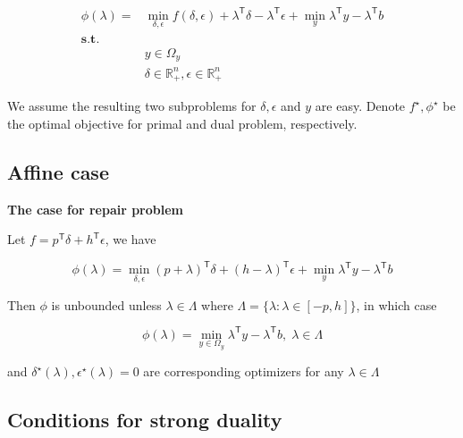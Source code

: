 \begin{equation}\label{eq:dual}
  \begin{aligned}
    \phi(\lambda) = & \min_{\delta, \epsilon} f(\delta, \epsilon) + \lambda^\mathsf{T}\delta - \lambda^\mathsf{T} \epsilon+ \min_y \lambda^\mathsf{T} y - \lambda^\mathsf{T} b \\
    \mathbf{s.t.}   &                                                                                                                                                          \\
                    & y \in \Omega_y                                                                                                                                           \\
                    & \delta \in \mathbb{R}^n_+ , \epsilon \in \mathbb{R}^n_+
  \end{aligned}
\end{equation}

We assume the resulting two subproblems for \(\delta, \epsilon\) and
\(y\) are easy. Denote $f^\star, \phi^\star$ be the optimal objective for primal and dual problem, respectively.

\hypertarget{affine-case}{%
  \subsection{Affine case}\label{affine-case}}

\textbf{The case for repair problem}

Let \(f=p^\mathsf{T}\delta + h^\mathsf{T} \epsilon\), we have

\[\phi(\lambda) = \min_{\delta, \epsilon} (p+ \lambda)^\mathsf{T}\delta + (h - \lambda)^\mathsf{T} \epsilon+ \min_y \lambda^\mathsf{T} y - \lambda^\mathsf{T} b\]

Then \(\phi\) is unbounded unless \(\lambda \in \Lambda\) where
\(\Lambda = \{\lambda: \lambda \in [-p, h]\}\), in which case

\[\phi(\lambda) = \min_{y\in \Omega_y} \lambda^\mathsf{T} y - \lambda^\mathsf{T} b,\; \lambda\in \Lambda\]

and \(\delta^\star(\lambda), \epsilon^\star(\lambda)= 0\) are corresponding optimizers
for any \(\lambda \in \Lambda\)

\hypertarget{conditions-for-strong-duality}{%
  \subsection{Conditions for strong
    duality}\label{conditions-for-strong-duality}}

